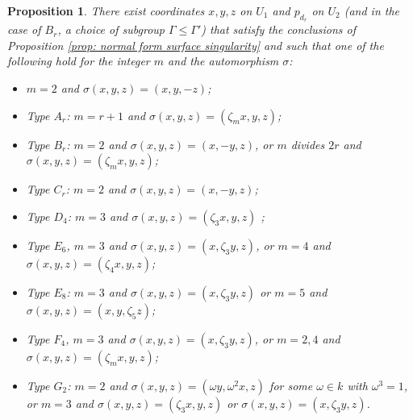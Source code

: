 \documentclass{article} %
\newtheorem{proposition}{Proposition}[section]
\numberwithin{equation}{section}
\theoremstyle{definition}
\newcommand{\rl}{r} %
\begin{document}
\begin{proposition}\label{proposition: normal form Gamma and sigma}
    There exist coordinates $x,y,z$ on $U_1$ and $p_{d_r}$ on $U_2$ (and in the case of $B_{\rl}$, a choice of subgroup $\Gamma\leq \Gamma'$) that satisfy the conclusions of Proposition \ref{prop: normal form surface singularity} and such that one of the following hold for the integer $m$ and the automorphism $\sigma$:
    \begin{itemize}
        \item $m=2$ and $\sigma(x,y,z) = (x,y,-z)$;
        \item Type $A_{\rl}$: $m=\rl+1$ and $\sigma(x,y,z) = (\zeta_m x, y,z)$;
        \item Type $B_{\rl}$: $m=2$ and $\sigma(x,y,z)= (x,-y,z)$, or $m$ divides $2r$ and $\sigma(x,y,z) = (\zeta_mx,y,z)$;
        \item Type $C_{\rl}$: $m=2$ and $\sigma(x,y,z) = (x,-y,z)$;
        \item Type $D_{4}$: $m=3$ and $\sigma(x,y,z) = (\zeta_3x ,y,z)$ ;
        \item Type $E_6$, $m=3$ and $\sigma(x,y,z) = (x,\zeta_3 y,z)$, or $m=4$ and $\sigma(x,y,z) = (\zeta_4 x,y,z)$;
        \item Type $E_8$: $m=3$ and $\sigma(x,y,z) = (x, \zeta_3 y,z)$ or $m=5$ and $\sigma(x,y,z) = (x,y,\zeta_5 z)$;
        \item Type $F_4$, $m=3$ and $\sigma(x,y,z) = (x,\zeta_3 y,z)$, or $m=2,4$ and $\sigma(x,y,z) = (\zeta_mx ,y,z)$;
        \item Type $G_2$: $m=2$ and $\sigma(x,y,z) = (\omega y,\omega^2 x,z)$ for some $\omega\in k$ with $\omega^3=1$, or $m=3$ and $\sigma(x,y,z) = (\zeta_3x,y,z)$ or $\sigma(x,y,z) = (x,\zeta_3y,z)$.
    \end{itemize}
\end{proposition}
\end{document}
